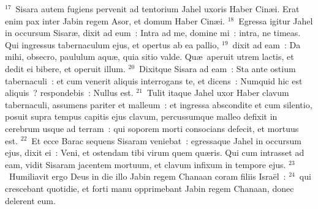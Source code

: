 ${}^{17}$~Sisara autem fugiens pervenit ad tentorium Jahel uxoris Haber Cin\ae i. Erat enim pax inter Jabin regem Asor, et domum Haber Cin\ae i.
${}^{18}$~Egressa igitur Jahel in occursum Sisar\ae , dixit ad eum~: Intra ad me, domine mi~: intra, ne timeas. Qui ingressus tabernaculum ejus, et opertus ab ea pallio,
${}^{19}$~dixit ad eam~: Da mihi, obsecro, paululum aqu\ae , quia sitio valde. Qu\ae\ aperuit utrem lactis, et dedit ei bibere, et operuit illum.
${}^{20}$~Dixitque Sisara ad eam~: Sta ante ostium tabernaculi~: et cum venerit aliquis interrogans te, et dicens~: Numquid hic est aliquis~? respondebis~: Nullus est.
${}^{21}$~Tulit itaque Jahel uxor Haber clavum tabernaculi, assumens pariter et malleum~: et ingressa abscondite et cum silentio, posuit supra tempus capitis ejus clavum, percussumque malleo defixit in cerebrum usque ad terram~: qui soporem morti consocians defecit, et mortuus est.
${}^{22}$~Et ecce Barac sequens Sisaram veniebat~: egressaque Jahel in occursum ejus, dixit ei~: Veni, et ostendam tibi virum quem qu\ae ris. Qui cum intrasset ad eam, vidit Sisaram jacentem mortuum, et clavum infixum in tempore ejus.
${}^{23}$~Humiliavit ergo Deus in die illo Jabin regem Chanaan coram filiis Isra\"el~:
${}^{24}$~qui crescebant quotidie, et forti manu opprimebant Jabin regem Chanaan, donec delerent eum.

